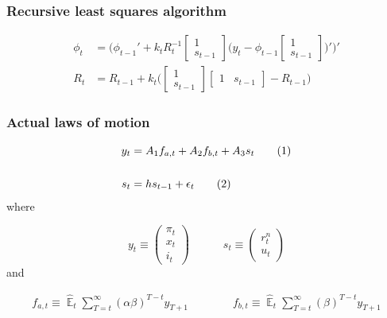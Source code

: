 \documentclass[10pt]{beamer}
\newcommand\numberthis{\addtocounter{equation}{1}\tag{\theequation}} %
\DeclareMathOperator{\E}{\mathbb{E}}
\begin{document}
\begin{frame}[plain]  %
	\frametitle{Recursive least squares algorithm}
	\label{RLS}


\begin{align}
\phi_t  & = \bigg( \phi_{t-1}' + k_t R_t^{-1}\begin{bmatrix} 1 \\ s_{t-1} \end{bmatrix}\bigg(y_{t} - \phi_{t-1} \begin{bmatrix} 1 \\ s_{t-1} \end{bmatrix} \bigg)' \bigg)' \\
R_t &= R_{t-1} +  k_t \bigg( \begin{bmatrix} 1 \\ s_{t-1} \end{bmatrix} \begin{bmatrix} 1 & s_{t-1} \end{bmatrix}  - R_{t-1} \bigg)
\end{align}


\vfill

\hyperlink{RLS_special}{}	


\end{frame}


\begin{frame}[plain]  %
	\frametitle{Actual laws of motion}
	\label{ALMs}

 \begin{align*}
y_t & = A_1 f_{a,t} + A_2 f_{b,t} + A_3 s_t \label{LOM_LR} \numberthis \\
\\
s_t & = h s_{t-1} + \epsilon_t \label{exog} \numberthis
\end{align*}
where

\begin{equation}
 y_t \equiv \begin{pmatrix} \pi_t \\ x_t \\ i_t
 \end{pmatrix} 
 \quad \quad \quad 
  s_t  \equiv \begin{pmatrix} r_t^n \\ u_t 
 \end{pmatrix} 
\end{equation}
and

  \begin{align}
f_{a,t}  \equiv  \hat{\E}_t\sum_{T=t}^{\infty} (\alpha\beta)^{T-t } y_{T+1} \quad \quad \quad \quad 
f_{b,t}  \equiv \hat{\E}_t\sum_{T=t}^{\infty} (\beta)^{T-t } y_{T+1} \label{fafb}
\end{align}

\hyperlink{aggregate_LOMS}{}	


\end{frame}
\end{document}
